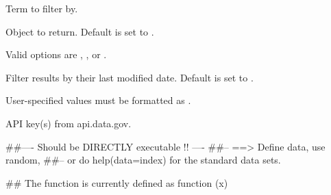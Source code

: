 \documentclass[a4paper]{book}
\begin{document}
%
\begin{Arguments}
\begin{ldescription}
\item[\code{searchTerm}] 
Term to filter by. 

\item[\code{documents}] 
Object to return. Default is set to . 

Valid options are , , or . 


\item[\code{lastModifiedDate}] 
Filter results by their last modified date. Default is set to . 

User-specified values must be formatted as .


\item[\code{api\_keys}] API key(s) from api.data.gov. 

\end{ldescription}
\end{Arguments}
%
\begin{Examples}
\begin{ExampleCode}
##---- Should be DIRECTLY executable !! ----
##-- ==>  Define data, use random,
##--	or do  help(data=index)  for the standard data sets.

## The function is currently defined as
function (x) 
{
  }
\end{ExampleCode}
\end{Examples}
\printindex{}
\end{document}
